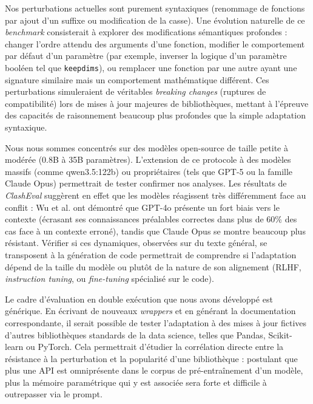 \documentclass[11pt, a4paper]{article}
\begin{document}
Nos perturbations actuelles sont purement syntaxiques (renommage de fonctions par ajout d'un suffixe ou modification de la casse). Une évolution naturelle de ce \textit{benchmark} consisterait à explorer des modifications sémantiques profondes : changer l'ordre attendu des arguments d'une fonction, modifier le comportement par défaut d'un paramètre (par exemple, inverser la logique d'un paramètre booléen tel que \texttt{keepdims}), ou remplacer une fonction par une autre ayant une signature similaire mais un comportement mathématique différent. Ces perturbations simuleraient de véritables \textit{breaking changes} (ruptures de compatibilité) lors de mises à jour majeures de bibliothèques, mettant à l'épreuve des capacités de raisonnement beaucoup plus profondes que la simple adaptation syntaxique.

Nous nous sommes concentrés sur des modèles open-source de taille petite à modérée (0.8B à 35B paramètres). L'extension de ce protocole à des modèles massifs (comme qwen3.5:122b) ou propriétaires (tels que GPT-5 ou la famille Claude Opus) permettrait de tester confirmer nos analyses. Les résultats de \textit{ClashEval} suggèrent en effet que les modèles réagissent très différemment face au conflit : Wu et al. ont démontré que GPT-4o présente un fort biais vers le contexte (écrasant ses connaissances préalables correctes dans plus de 60\% des cas face à un contexte erroné), tandis que Claude Opus se montre beaucoup plus résistant. Vérifier si ces dynamiques, observées sur du texte général, se transposent à la génération de code permettrait de comprendre si l'adaptation dépend de la taille du modèle ou plutôt de la nature de son alignement (RLHF, \textit{instruction tuning}, ou \textit{fine-tuning} spécialisé sur le code).

Le cadre d'évaluation en double exécution que nous avons développé est générique. En écrivant de nouveaux \textit{wrappers} et en générant la documentation correspondante, il serait possible de tester l'adaptation à des mises à jour fictives d'autres bibliothèques standards de la data science, telles que Pandas, Scikit-learn ou PyTorch. Cela permettrait d'étudier la corrélation directe entre la résistance à la perturbation et la popularité d'une bibliothèque : postulant que plus une API est omniprésente dans le corpus de pré-entraînement d'un modèle, plus la mémoire paramétrique qui y est associée sera forte et difficile à outrepasser via le prompt.
\end{document}
